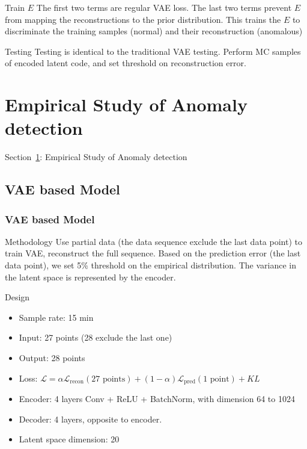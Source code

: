 \documentclass{beamer}
\begin{document}
\begin{frame}
\begin{frame}
\begin{frame}
\begin{frame}
\begin{frame}
\begin{block}{Train $E$}
The first two terms are regular VAE loss. The last two terms prevent $E$ from mapping the reconstructions to the prior distribution. 
This trains the $E$ to discriminate the training samples (normal) and their reconstruction (anomalous)
\end{block}

\begin{block}{Testing}
Testing is identical to the traditional VAE testing. Perform MC samples of encoded latent code, and set threshold on reconstruction error.
\end{block}

\end{frame}


\section{Empirical Study of Anomaly detection}
\label{sec-anomaly}
\begin{frame}
\centerline{Section~\ref{sec-anomaly}: Empirical Study of Anomaly detection}
\end{frame}

\subsection{VAE based Model}

\begin{frame}
\frametitle{VAE based Model}

\begin{block}{Methodology}
Use partial data (the data sequence exclude the last data point) to train VAE, reconstruct the full sequence. Based on the prediction error (the last data point), we set 5\% threshold on the empirical distribution. The variance in the latent space is represented by the encoder.
\end{block}

\begin{block}{Design}
\begin{itemize}
\setlength\itemsep{0em}
\item Sample rate: 15 min
\item Input: 27 points (28 exclude the last one)
\item Output: 28 points
\item Loss: $\mathcal{L} = \alpha \mathcal{L}_{\text{recon}}(\text{27 points}) + (1-\alpha) \mathcal{L}_{\text{pred}}(\text{1 point}) + KL$
\item Encoder: 4 layers Conv + ReLU + BatchNorm, with dimension 64 to 1024 \\
\item Decoder: 4 layers, opposite to encoder. \\
\item Latent space dimension: 20
\end{itemize}
\end{block}


\end{frame}
\end{frame}
\end{frame}
\end{frame}
\end{frame}
\end{document}
